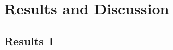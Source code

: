 \newpage
\section{Results and Discussion}\label{sec:Results}


\subsection{Results 1}\label{sec:project results}

